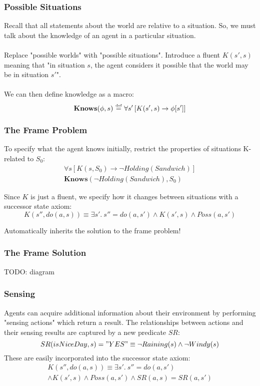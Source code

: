 \documentclass{beamer}
\newcommand{\isdef}{\hbox{$\stackrel{\mbox{\tiny def}}{=}$}}
\begin{document}
\begin{frame}
\frametitle{Possible Situations}
Recall that all statements about the world are relative to a situation.
So, we must talk about the knowledge of an agent in a particular situation.
\ \\
\ \\
\pause
Replace "possible worlds" with "possible situations".  Introduce a fluent
$K(s',s)$ meaning that "in situation $s$, the agent considers it possible
that the world may be in situation $s'$".
\ \\
\ \\
\pause
We can then define knowledge as a macro:
\[ \mathbf{Knows}(\phi,s)\ \isdef\ \forall s'\left[K(s',s)\rightarrow \phi[s']\right] \]

\end{frame}

\begin{frame}
\frametitle{The Frame Problem}
To specify what the agent knows initially, restrict the properties of situations
K-related to $S_0$:
\begin{gather*}
  \forall s \left[K(s,S_0) \rightarrow \neg Holding(Sandwich) \right] \\
  \mathbf{Knows}(\neg Holding(Sandwich),S_0)
\end{gather*}

\pause
Since $K$ is just a fluent, we specify how it changes  between situations
with a successor state axiom:
\begin{equation*}
 K(s'',do(a,s)) \equiv \exists s' . \ s''=do(a,s')
 \wedge K(s',s) \wedge Poss(a,s')
\end{equation*}

Automatically inherits the solution to the frame problem!
\end{frame}

\begin{frame}
\frametitle{The Frame Solution}

TODO: diagram

\end{frame}

\begin{frame}
\frametitle{Sensing}
Agents can acquire additional information about their environment by performing
"sensing actions" which return a result.  The relationships between actions
and their sensing results are captured by a new predicate $SR$:
\begin{equation*}
SR(isNiceDay,s) = "YES" \equiv \neg Raining(s) \wedge \neg Windy(s)
\end{equation*}
These are easily incorporated into the successor state axiom:
\begin{multline*}
 K(s'',do(a,s)) \equiv \exists s' . \ s''=do(a,s') \\
 \wedge K(s',s) \wedge Poss(a,s') \wedge SR(a,s) = SR(a,s')
\end{multline*}
\end{frame}
\end{document}
